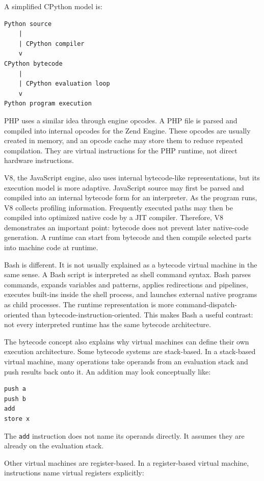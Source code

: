 \documentclass[a4paper,twoside]{report}
\begin{document}
A simplified CPython model is:

\begin{verbatim}
Python source
    |
    | CPython compiler
    v
CPython bytecode
    |
    | CPython evaluation loop
    v
Python program execution
\end{verbatim}

PHP uses a similar idea through engine opcodes. A PHP file is parsed and compiled into internal opcodes for the Zend Engine. These opcodes are usually created in memory, and an opcode cache may store them to reduce repeated compilation. They are virtual instructions for the PHP runtime, not direct hardware instructions.

V8, the JavaScript engine, also uses internal bytecode-like representations, but its execution model is more adaptive. JavaScript source may first be parsed and compiled into an internal bytecode form for an interpreter. As the program runs, V8 collects profiling information. Frequently executed paths may then be compiled into optimized native code by a JIT compiler. Therefore, V8 demonstrates an important point: bytecode does not prevent later native-code generation. A runtime can start from bytecode and then compile selected parts into machine code at runtime.

Bash is different. It is not usually explained as a bytecode virtual machine in the same sense. A Bash script is interpreted as shell command syntax. Bash parses commands, expands variables and patterns, applies redirections and pipelines, executes built-ins inside the shell process, and launches external native programs as child processes. The runtime representation is more command-dispatch-oriented than bytecode-instruction-oriented. This makes Bash a useful contrast: not every interpreted runtime has the same bytecode architecture.

The bytecode concept also explains why virtual machines can define their own execution architecture. Some bytecode systems are stack-based. In a stack-based virtual machine, many operations take operands from an evaluation stack and push results back onto it. An addition may look conceptually like:

\begin{verbatim}
push a
push b
add
store x
\end{verbatim}

The \texttt{add} instruction does not name its operands directly. It assumes they are already on the evaluation stack.

Other virtual machines are register-based. In a register-based virtual machine, instructions name virtual registers explicitly:
\end{document}
